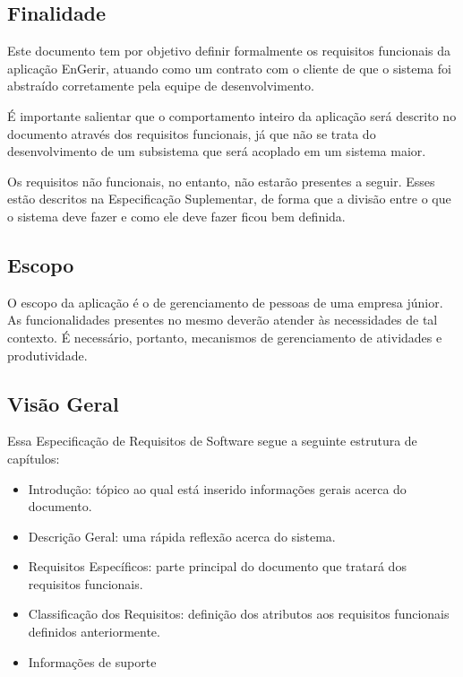 \begin{apendicesenv}
\subsection{Finalidade}

  Este documento tem por objetivo definir formalmente os requisitos funcionais da aplicação EnGerir, atuando como um contrato com o cliente de que o sistema foi abstraído corretamente pela equipe de desenvolvimento.

  É importante salientar que o comportamento inteiro da aplicação será descrito no documento através dos requisitos funcionais, já que não se trata do desenvolvimento de um subsistema que será acoplado em um sistema maior.

  Os requisitos não funcionais, no entanto, não estarão presentes a seguir. Esses estão descritos na Especificação Suplementar, de forma que a divisão entre o que o sistema deve fazer e como ele deve fazer ficou bem definida.

\subsection{Escopo}

O escopo da aplicação é o de gerenciamento de pessoas de uma empresa júnior. As funcionalidades presentes no mesmo deverão atender às necessidades de tal contexto. É necessário, portanto, mecanismos de gerenciamento de atividades e produtividade.

\subsection{Visão Geral}

Essa Especificação de Requisitos de Software segue a seguinte estrutura de capítulos:

\begin{itemize}
\item{Introdução: tópico ao qual está inserido informações gerais acerca do documento.}
\item{Descrição Geral: uma rápida reflexão acerca do sistema.}
\item{Requisitos Específicos: parte principal do documento que tratará dos requisitos funcionais.}
\item{Classificação dos Requisitos: definição dos atributos aos requisitos funcionais definidos anteriormente.}
\item{Informações de suporte}
\end{itemize}


\end{apendicesenv}
